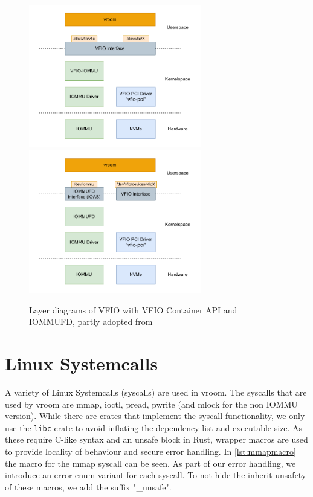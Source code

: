 \begin{figure}[H]
    \centering
     {\includegraphics[width=0.67\textwidth]{figures/VFIOLayer.pdf}}
     {\includegraphics[width=0.67\textwidth]{figures/IOMMUFDLayer.pdf}}
    \caption{Layer diagrams of VFIO with VFIO Container API and IOMMUFD, partly adopted from \cite{dpdkiommufd}}
    \label{fig:layer}
\end{figure}

\section{Linux Systemcalls}
A variety of Linux Systemcalls (syscalls) are used in vroom. The syscalls that are used by vroom are mmap, ioctl, pread, pwrite (and mlock for the non IOMMU version). While there are crates that implement the syscall functionality, we only use the \texttt{libc} crate to avoid inflating the dependency list and executable size. As these require C-like syntax and an unsafe block in Rust, wrapper macros are used to provide locality of behaviour and secure error handling. In \autoref{lst:mmapmacro} the macro for the mmap syscall can be seen.
As part of our error handling, we introduce an error enum variant for each syscall. To not hide the inherit unsafety of these macros, we add the suffix "\_unsafe".

